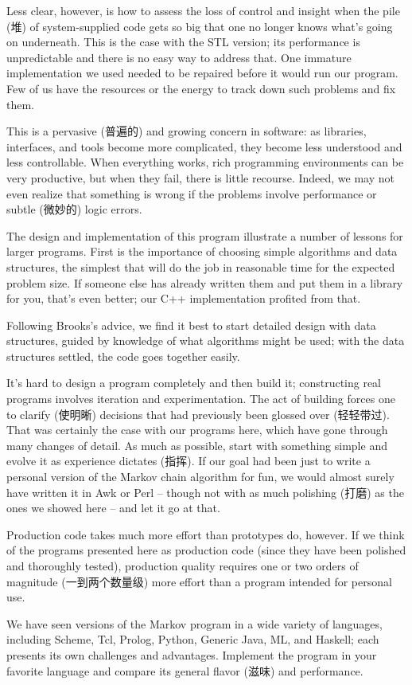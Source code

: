 Less clear, however, is how to assess the loss of control and insight when
the pile (堆) of system-supplied code gets so big that one no longer knows
what's going on underneath. This is the case with the STL version; its
performance is unpredictable and there is no easy way to address that. One
immature implementation we used needed to be repaired before it would run
our program. Few of us have the resources or the energy to track down such
problems and fix them.

This is a pervasive (普遍的) and growing concern in software: as libraries,
interfaces, and tools become more complicated, they become less understood
and less controllable.  When everything works, rich programming
environments can be very productive, but when they fail, there is little
recourse. Indeed, we may not even realize that something is wrong if the
problems involve performance or subtle (微妙的) logic errors.

The design and implementation of this program illustrate a number of
lessons for larger programs. First is the importance of choosing simple
algorithms and data structures, the simplest that will do the job in
reasonable time for the expected problem size. If someone else has already
written them and put them in a library for you, that's even better; our C++
implementation profited from that.

Following Brooks's advice, we find it best to start detailed design with
data structures, guided by knowledge of what algorithms might be used; with
the data structures settled, the code goes together easily.

It's hard to design a program completely and then build it; constructing
real programs involves iteration and experimentation. The act of building
forces one to clarify (使明晰) decisions that had previously been glossed
over (轻轻带过). That was certainly the case with our programs here, which
have gone through many changes of detail. As much as possible, start with
something simple and evolve it as experience dictates (指挥).  If our goal
had been just to write a personal version of the Markov chain algorithm for
fun, we would almost surely have written it in Awk or Perl -- though not
with as much polishing (打磨) as the ones we showed here -- and let it go
at that.

Production code takes much more effort than prototypes do, however. If we
think of the programs presented here as production code (since they have
been polished and thoroughly tested), production quality requires one or
two orders of magnitude (一到两个数量级) more effort than a program
intended for personal use.

\begin{exercise}
We have seen versions of the Markov program in a wide variety of languages,
including Scheme, Tcl, Prolog, Python, Generic Java, ML, and Haskell; each
presents its own challenges and advantages. Implement the program in your
favorite language and compare its general flavor (滋味) and performance.
\end{exercise}
